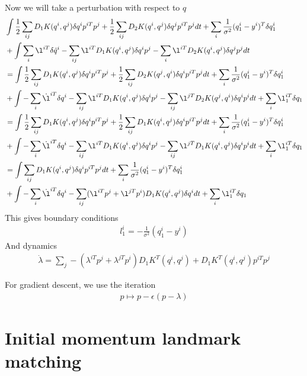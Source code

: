 \documentclass{article}
\begin{document}
Now we will take a perturbation with respect to $q$
\begin{align*}
&\int \frac12 \sum_{ij}D_1K(q^i,q^j)\delta q^i p^{iT}p^j + \frac12 \sum_{ij}D_2K(q^i,q^j)\delta q^j p^{iT}p^j  dt + \sum_i \frac{1}{\sigma^2}(q^i_1 - y^i)^T \delta q^i_1\\
& + \int \sum_i \l^{iT} \delta \dot q^i - \sum_{ij}\l^{iT}D_1 K(q^i,q^j)\delta q^i p^j - \sum_i \l^{iT}D_2 K(q^i,q^j)\delta q^j p^j dt\\
&=
\int \frac12 \sum_{ij}D_1K(q^i,q^j)\delta q^i p^{iT}p^j + \frac12 \sum_{ij}D_2K(q^j,q^i)\delta q^i p^{iT}p^j  dt + \sum_i \frac{1}{\sigma^2}(q^i_1 - y^i)^T \delta q^i_1\\
& + \int -\sum_i \dot \l^{iT} \delta q^i  - \sum_{ij}\l^{iT}D_1 K(q^i,q^j)\delta q^i p^j - \sum_{ij} \l^{jT}D_2 K(q^j,q^i)\delta q^i p^i dt + \sum_i \l^{iT}_1 \delta q_1 \\
&=
\int \frac12 \sum_{ij}D_1K(q^i,q^j)\delta q^i p^{iT}p^j + \frac12 \sum_{ij}D_1K(q^i,q^j)\delta q^i p^{iT}p^j  dt + \sum_i \frac{1}{\sigma^2}(q^i_1 - y^i)^T \delta q^i_1\\
& + \int -\sum_i \dot \l^{iT} \delta q^i  - \sum_{ij}\l^{iT}D_1 K(q^i,q^j)\delta q^i p^j - \sum_{ij} \l^{jT}D_1 K(q^i,q^j)\delta q^i p^i dt + \sum_i \l^{iT}_1 \delta q_1 \\
&=
\int \sum_{ij}D_1K(q^i,q^j)\delta q^i p^{iT}p^j   dt + \sum_i \frac{1}{\sigma^2}(q^i_1 - y^i)^T \delta q^i_1\\
& + \int -\sum_i \dot \l^{iT} \delta q^i  - \sum_{ij}(\l^{iT} p^j + \l^{jT}p^i)D_1 K(q^i,q^j)\delta q^i dt + \sum_i \l^{iT}_1 \delta q_1 \\
\end{align*}
This gives boundary conditions
\begin{align*}
l_1^i = -\frac{1}{\sigma^2}(q_1^i - y^i)
\end{align*}
And dynamics
\begin{align*}
\dot \lambda = \sum_j -(\lambda^{iT}p^j + \lambda^{jT}p^i)D_1K^T(q^i,q^j) + D_1 K^T(q^i,q^j) p^{iT}p^j
\end{align*}

For gradient descent, we use the iteration
\begin{align*}
p \mapsto p - \epsilon(p - \lambda)
\end{align*}
\section{Initial momentum landmark matching}
\end{document}

